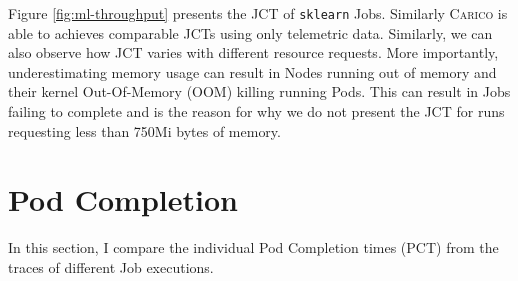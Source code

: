 Figure \ref{fig:ml-throughput} presents the JCT of \texttt{sklearn}
Jobs. Similarly \textsc{Carico} is able to achieves comparable JCTs using only
telemetric data. Similarly, we can also observe how JCT varies with different
resource requests. More importantly, underestimating memory usage can result in
Nodes running out of memory and their kernel Out-Of-Memory (OOM) killing running Pods.
This can result in Jobs failing to complete and is the reason for why we do not
present the JCT for runs requesting less than 750Mi bytes of memory.

\section{Pod Completion}
\label{sec:eval-pod-completion}
In this section, I compare the individual Pod Completion times (PCT) from the
traces of different Job executions.


